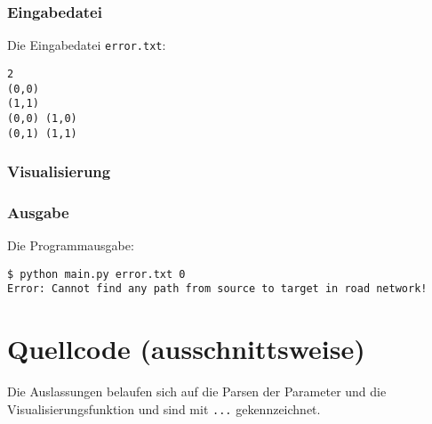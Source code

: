 \documentclass[a4paper,10pt,ngerman]{scrartcl}
\begin{document}
\subsubsection{Eingabedatei}
Die Eingabedatei \texttt{error.txt}:
\begin{lstlisting}
2
(0,0)
(1,1)
(0,0) (1,0)
(0,1) (1,1)
\end{lstlisting}

\subsubsection{Visualisierung}


\subsubsection{Ausgabe}
Die Programmausgabe:
\begin{lstlisting}
$ python main.py error.txt 0
Error: Cannot find any path from source to target in road network!
\end{lstlisting}

\section{Quellcode (ausschnittsweise)}
Die Auslassungen belaufen sich auf die Parsen der Parameter und die Visualisierungsfunktion und sind mit \texttt{...} gekennzeichnet.


\printbibliography
\end{document}
